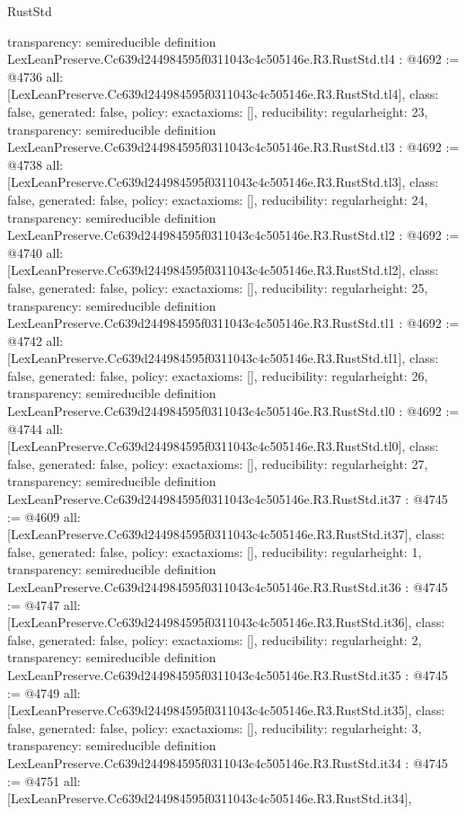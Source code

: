 \begin{lexlean}{RustStd}
\begin{coremodule}
{  transparency: semireducible
}
definition LexLeanPreserve.Cc639d244984595f0311043c4c505146e.R3.RustStd.tl4 : @4692 := @4736 {
  all: [LexLeanPreserve.Cc639d244984595f0311043c4c505146e.R3.RustStd.tl4],
  class: false,
  generated: false,
  policy: exact{axioms: []},
  reducibility: regular{height: 23},
  transparency: semireducible
}
definition LexLeanPreserve.Cc639d244984595f0311043c4c505146e.R3.RustStd.tl3 : @4692 := @4738 {
  all: [LexLeanPreserve.Cc639d244984595f0311043c4c505146e.R3.RustStd.tl3],
  class: false,
  generated: false,
  policy: exact{axioms: []},
  reducibility: regular{height: 24},
  transparency: semireducible
}
definition LexLeanPreserve.Cc639d244984595f0311043c4c505146e.R3.RustStd.tl2 : @4692 := @4740 {
  all: [LexLeanPreserve.Cc639d244984595f0311043c4c505146e.R3.RustStd.tl2],
  class: false,
  generated: false,
  policy: exact{axioms: []},
  reducibility: regular{height: 25},
  transparency: semireducible
}
definition LexLeanPreserve.Cc639d244984595f0311043c4c505146e.R3.RustStd.tl1 : @4692 := @4742 {
  all: [LexLeanPreserve.Cc639d244984595f0311043c4c505146e.R3.RustStd.tl1],
  class: false,
  generated: false,
  policy: exact{axioms: []},
  reducibility: regular{height: 26},
  transparency: semireducible
}
definition LexLeanPreserve.Cc639d244984595f0311043c4c505146e.R3.RustStd.tl0 : @4692 := @4744 {
  all: [LexLeanPreserve.Cc639d244984595f0311043c4c505146e.R3.RustStd.tl0],
  class: false,
  generated: false,
  policy: exact{axioms: []},
  reducibility: regular{height: 27},
  transparency: semireducible
}
definition LexLeanPreserve.Cc639d244984595f0311043c4c505146e.R3.RustStd.it37 : @4745 := @4609 {
  all: [LexLeanPreserve.Cc639d244984595f0311043c4c505146e.R3.RustStd.it37],
  class: false,
  generated: false,
  policy: exact{axioms: []},
  reducibility: regular{height: 1},
  transparency: semireducible
}
definition LexLeanPreserve.Cc639d244984595f0311043c4c505146e.R3.RustStd.it36 : @4745 := @4747 {
  all: [LexLeanPreserve.Cc639d244984595f0311043c4c505146e.R3.RustStd.it36],
  class: false,
  generated: false,
  policy: exact{axioms: []},
  reducibility: regular{height: 2},
  transparency: semireducible
}
definition LexLeanPreserve.Cc639d244984595f0311043c4c505146e.R3.RustStd.it35 : @4745 := @4749 {
  all: [LexLeanPreserve.Cc639d244984595f0311043c4c505146e.R3.RustStd.it35],
  class: false,
  generated: false,
  policy: exact{axioms: []},
  reducibility: regular{height: 3},
  transparency: semireducible
}
definition LexLeanPreserve.Cc639d244984595f0311043c4c505146e.R3.RustStd.it34 : @4745 := @4751 {
  all: [LexLeanPreserve.Cc639d244984595f0311043c4c505146e.R3.RustStd.it34],
}
\end{coremodule}
\end{lexlean}
